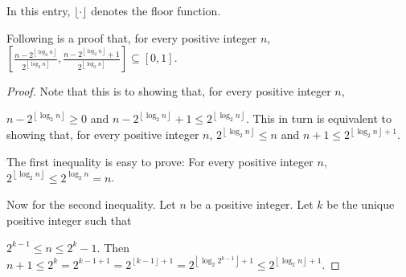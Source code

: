 \documentclass[12pt]{article}
\begin{document}

In this entry, $\lfloor \cdot \rfloor$ denotes the floor function.

Following is a proof that, for every positive integer $n$, $\displaystyle \left[ \frac{n-2^{\left\lfloor \log_2 n \right\rfloor}}{2^{\left\lfloor \log_2 n \right\rfloor}} , \frac{n-2^{\left\lfloor \log_2 n \right\rfloor}+1}{2^{\left\lfloor \log_2 n \right\rfloor}} \right] \subseteq \left[ 0,1 \right]$.

\begin{proof}
Note that this is  to showing that, for every positive integer $n$,

$\displaystyle n-2^{\left\lfloor \log_2 n \right\rfloor} \ge 0$ and $\displaystyle n-2^{\left\lfloor \log_2 n \right\rfloor}+1 \le 2^{\left\lfloor \log_2 n \right\rfloor}$. This in turn is equivalent to showing that, for every positive integer $n$, $\displaystyle 2^{\left\lfloor \log_2 n \right\rfloor} \le n$ and $\displaystyle n+1 \le 2^{\left\lfloor \log_2 n \right\rfloor+1}$.

The first inequality is easy to prove: For every positive integer $n$, $\displaystyle 2^{\left\lfloor \log_2 n \right\rfloor} \le 2^{\log_2 n}=n$.

Now for the second inequality. Let $n$ be a positive integer. Let $k$ be the unique positive integer such that

$2^{k-1} \le n \le 2^k-1$. Then $\displaystyle n+1 \le 2^k=2^{k-1+1}=2^{\left\lfloor k-1 \right\rfloor+1}=2^{\left\lfloor \log_2 2^{k-1} \right\rfloor+1} \le 2^{\left\lfloor \log_2 n \right\rfloor+1}$.
\end{proof}
\end{document}
